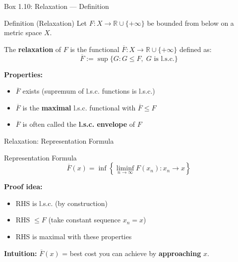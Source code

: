 \documentclass[aspectratio=169]{beamer}
\newcommand{\R}{\mathbb{R}}
\begin{document}
\begin{frame}{Box 1.10: Relaxation --- Definition}
\begin{block}{Definition (Relaxation)}
Let $F: X \to \R \cup \{+\infty\}$ be bounded from below on a metric space $X$.

The \textbf{relaxation} of $F$ is the functional $\overline{F}: X \to \R \cup \{+\infty\}$ defined as:
\[
\overline{F} := \sup\{G : G \leq F, \; G \text{ is l.s.c.}\}
\]
\end{block}

\vspace{0.3cm}
\textbf{Properties:}
\begin{itemize}
    \item $\overline{F}$ exists (supremum of l.s.c. functions is l.s.c.)
    \item $\overline{F}$ is the \textbf{maximal} l.s.c. functional with $\overline{F} \leq F$
    \item $\overline{F}$ is often called the \textbf{l.s.c. envelope} of $F$
\end{itemize}
\end{frame}

\begin{frame}{Relaxation: Representation Formula}
\begin{block}{Representation Formula}
\[
\boxed{\overline{F}(x) = \inf\left\{\liminf_{n \to \infty} F(x_n) : x_n \to x\right\}}
\]
\end{block}

\vspace{0.3cm}
\textbf{Proof idea:}
\begin{itemize}
    \item RHS is l.s.c. (by construction)
    \item RHS $\leq F$ (take constant sequence $x_n = x$)
    \item RHS is maximal with these properties
\end{itemize}

\vspace{0.3cm}
\textbf{Intuition:} $\overline{F}(x)$ = best cost you can achieve by \textbf{approaching} $x$.
\end{frame}
\end{document}
